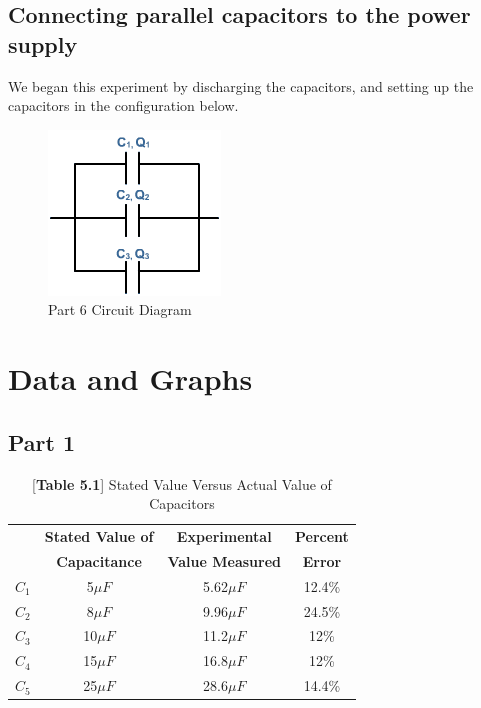 \documentclass[titlepage]{article}
\begin{document}
        \subsection{Connecting parallel capacitors to the power supply} 
        We began this experiment by discharging the capacitors, and setting up the capacitors in the configuration below. 


        \begin{figure}[hbt!] 
            \centering
            \caption*{Part 6 Circuit Diagram}
            \includegraphics[scale=1]{images/procedure/part6.png}
        \end{figure} 




	\section{Data and Graphs}
	    \subsection{Part 1}
        \FloatBarrier
		\begin{table}[hbt!]
			\centering
			\caption*{[\textbf{Table 5.1}] Stated Value Versus Actual Value of Capacitors}
			\begin{tabular}{c|c|c|c}
				&\textbf{Stated Value of} &\textbf{Experimental} &\textbf{Percent}\\
				& \textbf{Capacitance} & \textbf{Value Measured} & \textbf{Error}\\
				\hline
			$C_1$ & 5$\mu F$ & 5.62$\mu F$ & 12.4\% \\ 
			$C_2$ & 8$\mu F$ & 9.96$\mu F$ & 24.5\% \\ 
			$C_3$ & 10$\mu F$ & 11.2$\mu F$ & 12\% \\ 
			$C_4$ & 15$\mu F$ & 16.8$\mu F$ & 12\% \\ 
			$C_5$ & 25$\mu F$ & 28.6$\mu F$ & 14.4\% \\ 
			\end{tabular}
		\end{table}
        \FloatBarrier
\end{document}
